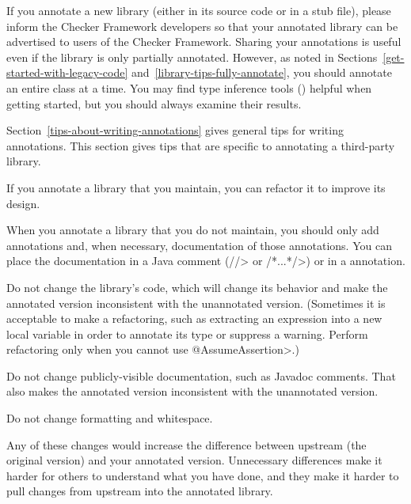 If you annotate a new library (either in its source code or in a stub
file), please inform the Checker Framework
developers so that your annotated library can be advertised to users of the
Checker Framework.
Sharing your annotations is useful even if the library is only partially
annotated.
However, as noted in Sections~\ref{get-started-with-legacy-code} and~\ref{library-tips-fully-annotate}, you
should annotate an entire class at a time.
You may find type inference tools () helpful
when getting started, but you should always examine their results.



Section~\ref{tips-about-writing-annotations} gives general tips for writing
annotations.  This section gives tips that are specific to annotating a
third-party library.



If you annotate a library that you maintain, you can refactor it to improve
its design.

When you annotate a library that you do not maintain, you should only add
annotations and, when necessary, documentation of those annotations.  You
can place the documentation in a Java comment (\<//> or \</*...*/>) or in a
 annotation.

Do not change the library's code, which will change its behavior and make
the annotated version inconsistent with the unannotated version.
(Sometimes it is acceptable to make a refactoring, such as extracting an
expression into a new local variable in order to annotate its type or
suppress a warning.  Perform refactoring only when you cannot use
\<@AssumeAssertion>.)

Do not change publicly-visible documentation, such as Javadoc comments.
That also makes the annotated version inconsistent with the unannotated
version.

Do not change formatting and whitespace.

Any of these changes would increase the difference between upstream (the original
version) and your annotated version.  Unnecessary differences make it harder for others to
understand what you have done, and they make it harder to pull changes from
upstream into the annotated library.



